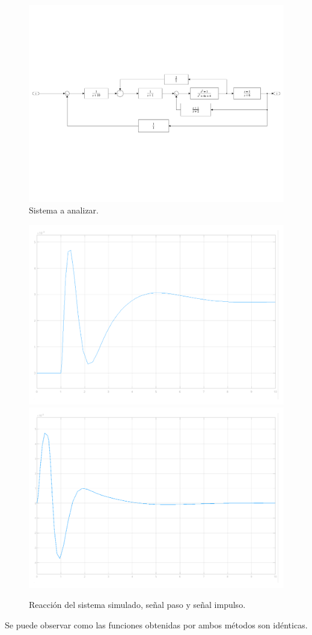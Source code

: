 \documentclass[journal, onecolumn]{IEEEtran}
\begin{document}
\begin{figure}[htbp!]
\begin{center}
    \includegraphics[width=0.8\linewidth]{system.pdf}
\end{center}
\caption{Sistema a analizar.}
\label{fig:system}
\end{figure}

\begin{figure}[htbp!]
\begin{center}
  \includegraphics[width=0.6\linewidth]{step.pdf}
  \includegraphics[width=0.6\linewidth]{pulse.pdf}
\end{center}
\caption{Reacción del sistema simulado, señal paso y señal impulso.}
\label{fig:sim}
\end{figure}


Se puede observar como las funciones obtenidas por ambos métodos son idénticas.
\end{document}
